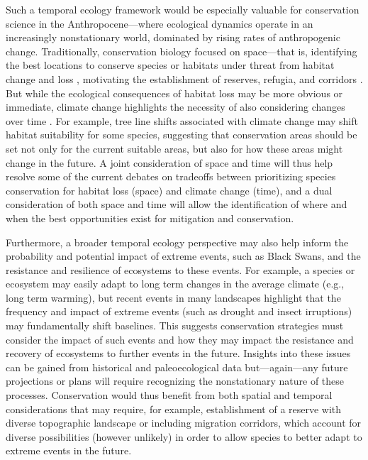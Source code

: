 \documentclass[11pt,a4paper,oneside]{article}
\begin{document}
Such a temporal ecology framework would be especially valuable for conservation science in the Anthropocene---where ecological dynamics operate in an increasingly nonstationary world, dominated by rising rates of anthropogenic change. Traditionally, conservation biology focused on space---that is, identifying the best locations to conserve species or habitats under threat from habitat change and loss \citep[e.g.,][]{Cincotta:2000gk}, motivating the establishment of reserves, refugia, and corridors \citep[e.g.,][]{Doak:1989oc}. But while the ecological consequences of habitat loss may be more obvious or immediate, climate change highlights the necessity of also considering changes over time \citep{Hannah2002}. For example, tree line shifts associated with climate change may shift habitat suitability for some species, suggesting that conservation areas should be set not only for the current suitable areas, but also for how these areas might change in the future. A joint consideration of space and time will thus help resolve some of the current debates \citep[e.g.,][]{Laurance2012} on tradeoffs between prioritizing species conservation for habitat loss (space) and climate change (time), and a dual consideration of both space and time will allow the identification of where and when the best opportunities exist for mitigation and conservation.

Furthermore, a broader temporal ecology perspective may also help inform the probability and potential impact of extreme events, such as Black Swans, and the resistance and resilience of ecosystems to these events. For example, a species or ecosystem may easily adapt to long term changes in the average climate (e.g., long term warming), but recent events in many landscapes \citep[e.g.,][]{Anderegg2013} highlight that the frequency and impact of extreme events (such as drought and insect irruptions) may fundamentally shift baselines. This suggests conservation strategies must consider the impact of such events and how they may impact the resistance and recovery of ecosystems to further events in the future. Insights into these issues can be gained from historical and paleoecological data but---again---any future projections or plans will require recognizing the nonstationary nature of these processes. Conservation would thus benefit from both spatial and temporal considerations that may require, for example, establishment of a reserve with diverse topographic landscape or including migration corridors, which account for diverse possibilities (however unlikely) in order to allow species to better adapt to extreme events in the future. \\
\end{document}

